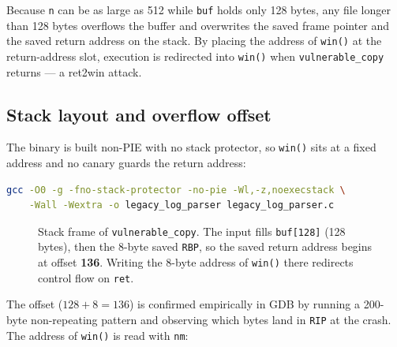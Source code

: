 \documentclass[11pt]{article}
\begin{document}
Because \texttt{n} can be as large as 512 while \texttt{buf} holds only 128
bytes, any file longer than 128 bytes overflows the buffer and overwrites the
saved frame pointer and the saved return address on the stack. By placing the
address of \texttt{win()} at the return-address slot, execution is redirected
into \texttt{win()} when \texttt{vulnerable\_copy} returns --- a ret2win attack.

\subsection{Stack layout and overflow offset}
The binary is built non-PIE with no stack protector, so \texttt{win()} sits at a
fixed address and no canary guards the return address:

\begin{lstlisting}[language=bash]
gcc -O0 -g -fno-stack-protector -no-pie -Wl,-z,noexecstack \
    -Wall -Wextra -o legacy_log_parser legacy_log_parser.c
\end{lstlisting}

\begin{figure}[H]
\centering
{}
\caption{Stack frame of \texttt{vulnerable\_copy}. The input fills
\texttt{buf[128]} (128 bytes), then the 8-byte saved \texttt{RBP}, so the saved
return address begins at offset \textbf{136}. Writing the 8-byte address of
\texttt{win()} there redirects control flow on \texttt{ret}.}
\end{figure}

The offset ($128 + 8 = 136$) is confirmed empirically in GDB by running a
200-byte non-repeating pattern and observing which bytes land in \texttt{RIP} at
the crash. The address of \texttt{win()} is read with \texttt{nm}:
\end{document}
